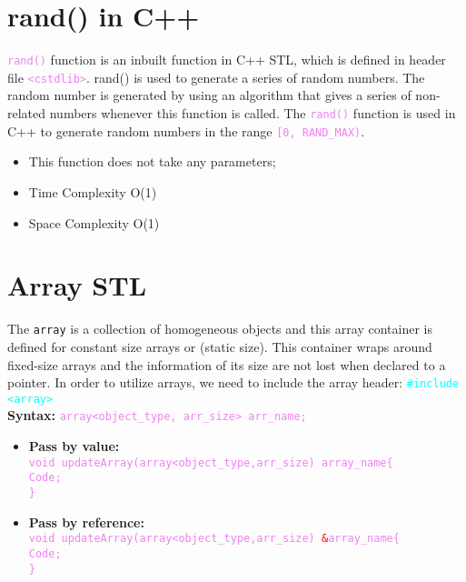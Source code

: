 \section{\textbf{rand() in C++}}
\textcolor{violet}{\texttt{rand()}} function is an inbuilt function in C++ STL, which is defined in header file \textcolor{violet}{\texttt{<cstdlib>}}. rand() is used to generate a series of random numbers. The random number is generated by using an algorithm that gives a series of non-related numbers whenever this function is called. The \textcolor{violet}{\texttt{rand()}} function is used in C++ to generate random numbers in the range \textcolor{violet}{\texttt{[0, RAND\_MAX)}}.

\begin{itemize}
	\item This function does not take any parameters;
	\item Time Complexity O(1)
	\item Space Complexity O(1)
\end{itemize}


\newpage
\section{\textbf{Array STL}}
The \texttt{array} is a collection of homogeneous objects and this array container is defined for constant size arrays or (static size). This container wraps around fixed-size arrays and the information of its size are not lost when declared to a pointer. 
In order to utilize arrays, we need to include the array header: 
\textcolor{cyan}{\texttt{\#include <array>}} \\

\textbf{Syntax:} \textcolor{violet}{\texttt{array<object\_type, arr\_size> arr\_name;}}

\begin{itemize}
	\item \textbf{Pass by value:}\\ \textcolor{violet}{\texttt{void updateArray(array<object\_type,arr\_size) array\_name\{\\ \tab Code;\\ \}}}
	
	\item \textbf{Pass by reference:}\\ \textcolor{violet}{\texttt{void updateArray(array<object\_type,arr\_size) \textcolor{red}{\&}array\_name\{\\ \tab Code;\\ \}}}
\end{itemize}

